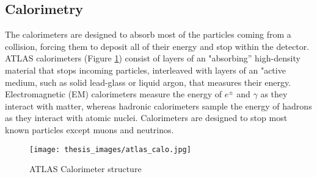 \documentclass[a4paper, oneside, 11pt, openright]{book}
\begin{document}
\begin{itemize}
					
				\end{itemize}
			
			\subsection{Calorimetry}
				The calorimeters are designed to absorb most of the particles coming from a collision, forcing them to deposit all of their energy and stop within the detector. \cite{ATLAS_DESIGN_2008} ATLAS calorimeters (Figure \ref{fig:all_calo_struct}) consist of layers of an "absorbing” high-density material that stops incoming particles, interleaved with layers of an "active medium, such as solid lead-glass or liquid argon, that measures their energy. Electromagnetic (EM) calorimeters measure the energy of $e^{\pm}$ and $\gamma$ as they interact with matter, whereas hadronic calorimeters sample the energy of hadrons as they interact with atomic nuclei. Calorimeters are designed to stop most known particles except muons and neutrinos.
				\begin{figure}
					\centering
					\texttt{[image: thesis\_images/atlas\_calo.jpg]}
					\caption{ATLAS Calorimeter structure}
					\label{fig:all_calo_struct}
				\end{figure}
\end{document}
